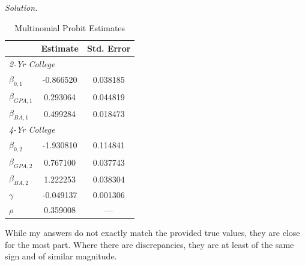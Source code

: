 \documentclass[11pt]{article}
\newenvironment{solution}{%
  \vspace{0.15em}
  \noindent\textit{Solution. }\ignorespaces
}{\vspace{0.5em}\par}
\newcommand{\1}{\mathbf{1}}
\begin{document}
\begin{solution}
  \begin{table}[htbp]
    \centering
    \caption{Multinomial Probit Estimates}
    
    \begin{tabular}{lcc}
      \hline
      & Estimate & Std. Error \\
      \hline
      \multicolumn{3}{l}{\textit{2-Yr College}} \\
      $\beta_{0,1}$    & -0.866520 & 0.038185 \\
      $\beta_{GPA,1}$  &  0.293064 & 0.044819 \\
      $\beta_{BA,1}$   &  0.499284 & 0.018473 \\

      \multicolumn{3}{l}{\textit{4-Yr College}} \\
      $\beta_{0,2}$    & -1.930810 & 0.114841 \\
      $\beta_{GPA,2}$  &  0.767100 & 0.037743 \\
      $\beta_{BA,2}$   &  1.222253 & 0.038304 \\

      \hline
      $\gamma$       & -0.049137 & 0.001306 \\
      $\rho$           &  0.359008 & --- \\
      \hline
    \end{tabular}
  \end{table}

  While my answers do not exactly match the provided true values, they are close for the most part. Where there are discrepancies, they are at least of the same sign and of similar magnitude.
\end{solution}
\end{document}
